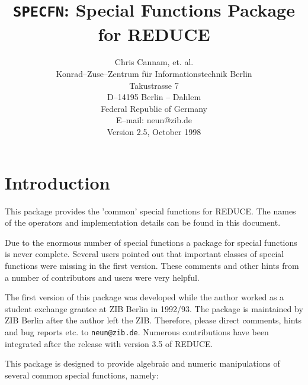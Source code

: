 \title{{\tt SPECFN}: Special Functions Package for REDUCE}
\date{}
\author{Chris Cannam, et. al.\\[0.05in]
Konrad--Zuse--Zentrum f\"ur Informationstechnik Berlin \\
Takustrasse 7\\
D--14195 Berlin -- Dahlem \\
Federal Republic of Germany \\[0.05in]
E--mail: neun@zib.de \\[0.05in]
Version 2.5, October 1998}

\maketitle
{}
\section{Introduction}

This package provides the 'common' special functions for REDUCE.
The names of the operators and implementation details can be
found in this document.

Due to the enormous number of special functions
a package for special functions is never complete.
Several users pointed out that important classes
of special functions were missing in the first version.
These comments and other hints from a number of contributors
and users were very helpful.

The first version of this package was developed while the author
worked as a student exchange grantee at ZIB Berlin in 1992/93.
The package is maintained by ZIB Berlin after the author left the ZIB.
Therefore, please direct comments, hints and bug reports etc. to
{\tt neun@zib.de}.
Numerous contributions have been integrated after the release with
version 3.5 of REDUCE. 

This package is designed to provide algebraic and numeric manipulations of
several common special functions, namely:

